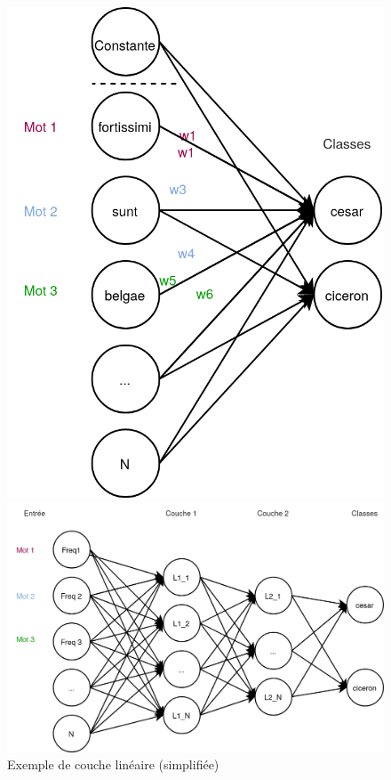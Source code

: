 \begin{figure}[h]
    \centering
    \noindent\begin{minipage}{.35\linewidth}
        \includegraphics[width=\linewidth]{figures/chap2/SimpleLinear.png}
        \caption{Exemple de couche linéaire (simplifiée)}
        \label{fig:deep-learning:simple-linear}
    \end{minipage}%
    \hspace{0.04\linewidth}
    \noindent\begin{minipage}{.60\linewidth}
        \includegraphics[width=\linewidth]{figures/chap2/MLP.png}

\end{minipage}
\end{figure}
